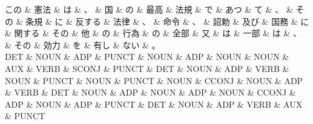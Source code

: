 \documentclass[tikz,border=5pt]{standalone}
\begin{document}
\small
\begin{dependency}[edge unit distance=6.6pt]
    \begin{deptext}[column sep=0.5em]
        この \& 憲法 \& は \& 、 \& 国 \& の \& 最高 \& 法規 \& で \& あつ \& て \& 、 \& その \& 条規 \& に \& 反する \& 法律 \& 、 \& 命令 \& 、 \& 詔勅 \& 及び \& 国務 \& に \& 関する \& その \& 他 \& の \& 行為 \& の \& 全部 \& 又 \& は \& 一部 \& は \& 、 \& その \& 効力 \& を \& 有し \& ない \& 。\\
        DET \& NOUN \& ADP \& PUNCT \& NOUN \& ADP \& NOUN \& NOUN \& AUX \& VERB \& SCONJ \& PUNCT \& DET \& NOUN \& ADP \& VERB \& NOUN \& PUNCT \& NOUN \& PUNCT \& NOUN \& CCONJ \& NOUN \& ADP \& VERB \& DET \& NOUN \& ADP \& NOUN \& ADP \& NOUN \& CCONJ \& ADP \& NOUN \& ADP \& PUNCT \& DET \& NOUN \& ADP \& VERB \& AUX \& PUNCT\\
    \end{deptext}
\end{dependency}
\end{document}

